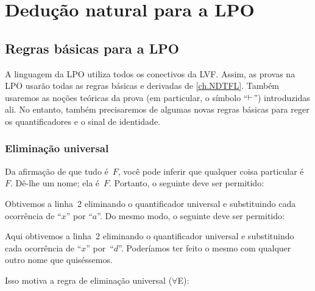 \part{Dedução natural para a LPO}
\label{ch.NDFOL}

\chapter{Regras básicas para a LPO}\label{s:BasicFOL}

A linguagem da LPO utiliza todos os conectivos da LVF. Assim, as provas na LPO usarão todas as regras básicas e derivadas de \cref{ch.NDTFL}. Também usaremos as noções teóricas da prova (em particular, o símbolo \textquotedblleft $\vdash$\textquotedblright{}) introduzidas ali. No entanto, também precisaremos de algumas novas regras básicas para reger os quantificadores e o sinal de identidade.


\section{Eliminação universal}\label{s:forallElim}

Da afirmação de que tudo é~$F$, você pode inferir que qualquer coisa particular é~$F$. Dê-lhe um nome; ela é~$F$. Portanto, o seguinte deve ser permitido:
\begin{fitchproof}
	\PR
	 
\end{fitchproof}
Obtivemos a linha~$2$ eliminando o quantificador universal e substituindo cada ocorrência de \textquotedblleft $x$\textquotedblright{} por \textquotedblleft $a$\textquotedblright{}. Do mesmo modo, o seguinte deve ser permitido:
\begin{fitchproof}
	\PR
	 
\end{fitchproof}
Aqui obtivemos a linha~$2$ eliminando o quantificador universal e substituindo cada ocorrência de \textquotedblleft $x$\textquotedblright{} por~\textquotedblleft $d$\textquotedblright{}. Poderíamos ter feito o mesmo com qualquer outro nome que quiséssemos.

Isso motiva a regra de eliminação universal ($\forall$E):


